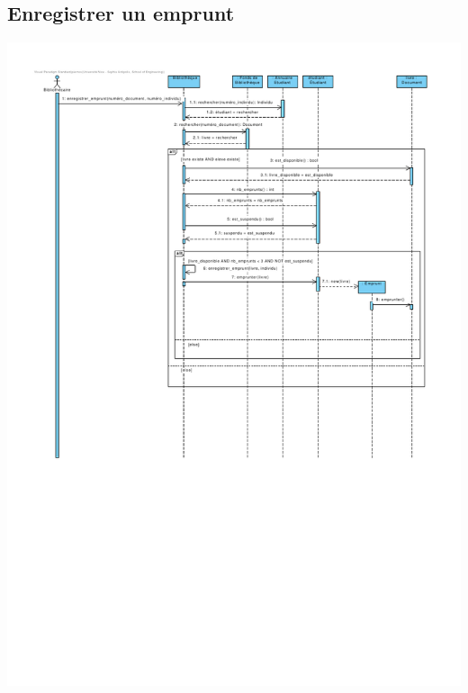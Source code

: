 \documentclass{article}
\begin{document}
\subsection{Enregistrer un emprunt}
\vspace{-5em}
\hspace*{-10em}\includegraphics[scale=1.56]{sequence_enregistrer_un_emprunt}
\vspace*{-4em}
\end{document}
